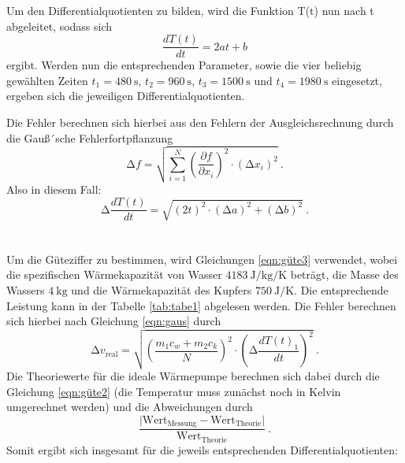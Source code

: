 Um den Differentialquotienten zu bilden, wird die Funktion T(t) nun nach t abgeleitet, sodass
sich
\begin{equation}
  \frac{d T(t)}{d t} = 2at +b
\end{equation}
ergibt.
Werden nun die entsprechenden Parameter, sowie die vier beliebig gewählten Zeiten
$t_1 = \SI{480}{\second}$, $t_2 = \SI{960}{\second}$, $t_3 = \SI{1500}{\second}$
und $t_4 = \SI{1980}{\second}$ eingesetzt, ergeben sich die jeweiligen Differentialquotienten.

Die Fehler berechnen sich hierbei aus den Fehlern der Ausgleichsrechnung durch die Gauß´sche
Fehlerfortpflanzung
\begin{equation}
  \increment f = \sqrt{ \sum_{i=1}^N \left( \frac{\partial f}{\partial x_i}\right)^2
  \cdot (\increment x_i)^2  } \: .
  \label{eqn:gaus}
\end{equation}
Also in diesem Fall:
\begin{equation}
  \increment \frac{d T(t)}{d t} = \sqrt{(2t)^2 \cdot (\increment a)^2 + (\increment b)^2 } \: .
  \label{eqn:f1}
\end{equation}
\\
\\
\noindent Um die Güteziffer zu bestimmen, wird Gleichungen \ref{eqn:güte3} verwendet,
wobei die spezifischen Wärmekapazität von Wasser $\SI{4183}{\joule\per\kilo\gram\per\kelvin}$ \cite{chemie}
beträgt, die Masse des Wassers $\SI{4}{\kilo\gram}$ und die Wärmekapazität des Kupfers
$\SI{750}{\joule\per\kelvin}$. Die entsprechende Leistung kann in der Tabelle \ref{tab:tabe1}
abgelesen werden.
Die Fehler berechnen sich hierbei nach Gleichung \ref{eqn:gaus} durch
\begin{equation}
  \increment v_{\text{real}} = \sqrt{\left(\frac{m_1c_w +m_2c_k}{N}\right)^2 \cdot \left(\increment \frac{d T(t)_1}{d t}\right)^2} \: .
  \label{eqn:f2}
\end{equation}
Die Theoriewerte für die ideale Wärmepumpe berechnen sich dabei durch die Gleichung
\ref{eqn:güte2} (die Temperatur muss zunächst noch in Kelvin umgerechnet werden) und die Abweichungen durch
\begin{equation*}
  \frac{\lvert \text{Wert}_{\text{Messung}}-\text{Wert}_{\text{Theorie}}\rvert}{\text{Wert}_{\text{Theorie}}} \: .
\end{equation*}
Somit ergibt sich insgesamt für die jeweils entsprechenden Differentialquotienten:


